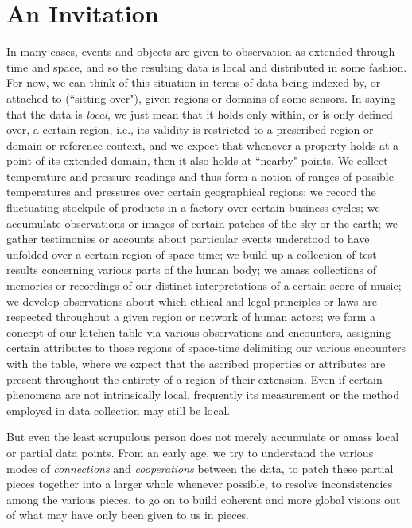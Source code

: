 \documentclass[a4paper]{book}
\theoremstyle{definition}
\theoremstyle{definition}
\theoremstyle{definition}
\theoremstyle{theorem}
\theoremstyle{definition}
\begin{document}
	\section{An Invitation} 
	In many cases, events and objects are given to observation as extended through time and space, and so the resulting data is local and distributed in some fashion. For now, we can think of this situation in terms of data being indexed by, or attached to (``sitting over"), given regions or domains of some sensors. In saying that the data is \textit{local}, we just mean that it holds only within, or is only defined over, a certain region, i.e., its validity is restricted to a prescribed region or domain or reference context, and we expect that whenever a property holds at a point of its extended domain, then it also holds at ``nearby" points. We collect temperature and pressure readings and thus form a notion of ranges of possible temperatures and pressures over certain geographical regions; we record the fluctuating stockpile of products in a factory over certain business cycles; we accumulate observations or images of certain patches of the sky or the earth; we gather testimonies or accounts about particular events understood to have unfolded over a certain region of space-time; we build up a collection of test results concerning various parts of the human body; we amass collections of memories or recordings of our distinct interpretations of a certain score of music; we develop observations about which ethical and legal principles or laws are respected throughout a given region or network of human actors; we form a concept of our kitchen table via various observations and encounters, assigning certain attributes to those regions of space-time delimiting our various encounters with the table, where we expect that the ascribed properties or attributes are present throughout the entirety of a region of their extension. Even if certain phenomena are not intrinsically local, frequently its measurement or the method employed in data collection may still be local. \par 
	But even the least scrupulous person does not merely accumulate or amass local or partial data points. From an early age, we try to understand the various modes of \textit{connections} and \textit{cooperations} between the data, to patch these partial pieces together into a larger whole whenever possible, to resolve inconsistencies among the various pieces, to go on to build coherent and more global visions out of what may have only been given to us in pieces.
\end{document}

